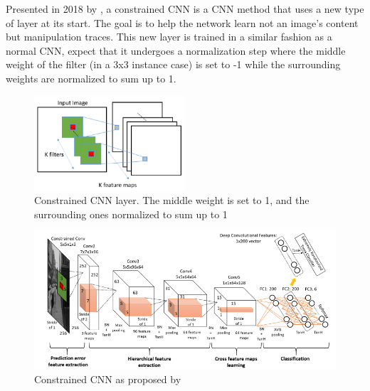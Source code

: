 \documentclass{article} %
\begin{document}
Presented in 2018 by \cite{8335799}, a constrained CNN is a CNN method that uses a new type of layer at its start. The goal is to help the network learn not an image's content but manipulation traces. This new layer is trained in a similar fashion as a normal CNN, expect that it undergoes a normalization step where the middle weight of the filter (in a 3x3 instance case) is set to -1 while the surrounding weights are normalized to sum up to 1.

\begin{figure}[H]
\begin{center}
\includegraphics[width=0.5\textwidth]{images/conslayer.png}
\end{center}
\caption{Constrained CNN layer. The middle weight is set to 1, and the surrounding ones normalized to sum up to 1}
\end{figure}

\begin{figure}[H]
\begin{center}
\includegraphics[width=\textwidth]{images/consCNN.png}
\end{center}
\caption{Constrained CNN as proposed by \cite{8335799}}
\end{figure}
\end{document}
